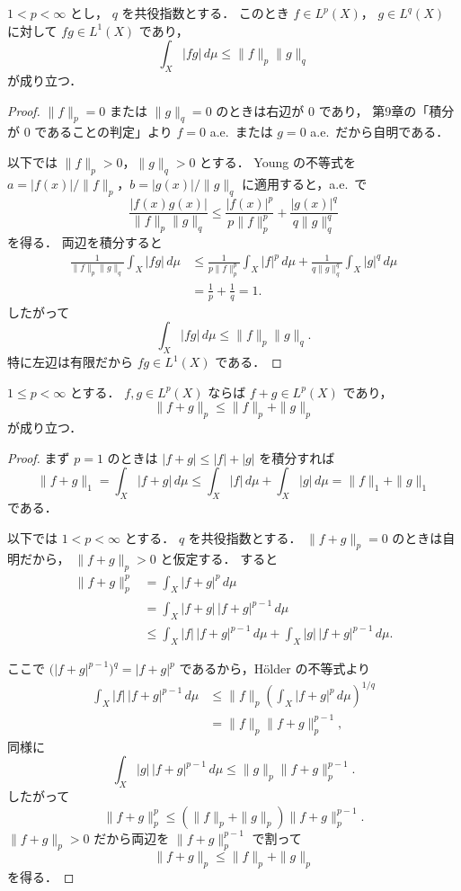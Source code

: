 \begin{theorem}[Hölderの不等式]
$1<p<\infty$ とし，
$q$ を共役指数とする．
このとき
$f\in L^p(X)$，
$g\in L^q(X)$ に対して
$fg\in L^1(X)$ であり，
\[
\int_X |fg|\,d\mu\le \|f\|_p\|g\|_q
\]
が成り立つ．
\end{theorem}
\begin{proof}
$\|f\|_p=0$ または $\|g\|_q=0$ のときは右辺が $0$ であり，
第9章の「積分が $0$ であることの判定」より
$f=0$ a.e.\ または $g=0$ a.e.\ だから自明である．

以下では
$\|f\|_p>0$，$\|g\|_q>0$ とする．
Young の不等式を
$a=|f(x)|/\|f\|_p$，$b=|g(x)|/\|g\|_q$ に適用すると，a.e.\ で
\[
\frac{|f(x)g(x)|}{\|f\|_p\|g\|_q}
\le
\frac{|f(x)|^p}{p\|f\|_p^p}
+\frac{|g(x)|^q}{q\|g\|_q^q}
\]
を得る．
両辺を積分すると
\begin{align*}
\frac{1}{\|f\|_p\|g\|_q}\int_X |fg|\,d\mu
&\le
\frac{1}{p\|f\|_p^p}\int_X |f|^p\,d\mu
+
\frac{1}{q\|g\|_q^q}\int_X |g|^q\,d\mu \\
&=
\frac{1}{p}+\frac{1}{q}
=1.
\end{align*}
したがって
\[
\int_X |fg|\,d\mu\le \|f\|_p\|g\|_q.
\]
特に左辺は有限だから $fg\in L^1(X)$ である．
\end{proof}

\begin{theorem}[Minkowskiの不等式]
$1\le p<\infty$ とする．
$f,g\in L^p(X)$ ならば
$f+g\in L^p(X)$ であり，
\[
\|f+g\|_p\le \|f\|_p+\|g\|_p
\]
が成り立つ．
\end{theorem}
\begin{proof}
まず $p=1$ のときは
$|f+g|\le |f|+|g|$ を積分すれば
\[
\|f+g\|_1
=
\int_X |f+g|\,d\mu
\le
\int_X |f|\,d\mu+\int_X |g|\,d\mu
=
\|f\|_1+\|g\|_1
\]
である．

以下では $1<p<\infty$ とする．
$q$ を共役指数とする．
$\|f+g\|_p=0$ のときは自明だから，
$\|f+g\|_p>0$ と仮定する．
すると
\begin{align*}
\|f+g\|_p^p
&=
\int_X |f+g|^p\,d\mu \\
&=
\int_X |f+g|\,|f+g|^{p-1}\,d\mu \\
&\le
\int_X |f|\,|f+g|^{p-1}\,d\mu
+
\int_X |g|\,|f+g|^{p-1}\,d\mu.
\end{align*}

ここで
$\bigl(|f+g|^{p-1}\bigr)^q=|f+g|^p$ であるから，Hölder の不等式より
\begin{align*}
\int_X |f|\,|f+g|^{p-1}\,d\mu
&\le
\|f\|_p
\left(
\int_X |f+g|^p\,d\mu
\right)^{1/q} \\
&=
\|f\|_p \|f+g\|_p^{p-1},
\end{align*}
同様に
\[
\int_X |g|\,|f+g|^{p-1}\,d\mu
\le
\|g\|_p \|f+g\|_p^{p-1}.
\]
したがって
\[
\|f+g\|_p^p
\le
(\|f\|_p+\|g\|_p)\|f+g\|_p^{p-1}.
\]
$\|f+g\|_p>0$ だから両辺を $\|f+g\|_p^{p-1}$ で割って
\[
\|f+g\|_p\le \|f\|_p+\|g\|_p
\]
を得る．
\end{proof}


